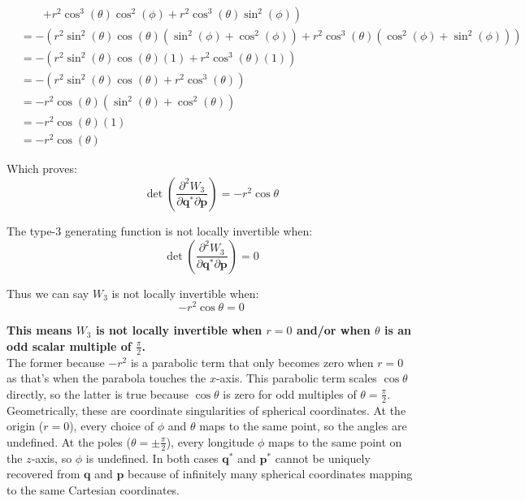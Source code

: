 \documentclass[titlepage]{article}
\begin{document}
\begin{equation}
\begin{split}
		&\qquad\left.+r^2\cos^3(\theta)\cos^2(\phi)+r^2\cos^3(\theta)\sin^2(\phi)\right) \\
		&=-\left(r^2\sin^2(\theta)\cos(\theta)\left(\sin^2(\phi)+\cos^2(\phi)\right)+r^2\cos^3(\theta)\left(\cos^2(\phi)+\sin^2(\phi)\right)\right) \\
		&=-\left(r^2\sin^2(\theta)\cos(\theta)\left(1\right)+r^2\cos^3(\theta)\left(1\right)\right) \\
		&=-\left(r^2\sin^2(\theta)\cos(\theta)+r^2\cos^3(\theta)\right) \\
		&=-r^2\cos(\theta)\left(\sin^2(\theta)+\cos^2(\theta)\right) \\
		&=-r^2\cos(\theta)(1) \\
		&=-r^2\cos(\theta)
	\end{split}
\end{equation}

\begin{mdframed}[linewidth=1pt, innertopmargin=10pt, innerbottommargin=10pt]
	Which proves:
	\begin{equation}
		\det\left(\frac{\partial^2W_3}{\partial\boldsymbol{q}^*\partial\boldsymbol{p}}\right)=-r^2\cos\theta
	\end{equation}
\end{mdframed}

\newpage

\begin{mdframed}[linewidth=1pt, innertopmargin=10pt, innerbottommargin=10pt]
	The type-3 generating function is not locally invertible when:
	\begin{equation}
		\det\left(\frac{\partial^2W_3}{\partial\boldsymbol{q}^*\partial\boldsymbol{p}}\right)=0
	\end{equation}
	
	Thus we can say $W_3$ is not locally invertible when:
	\begin{equation}
		-r^2\cos\theta=0
	\end{equation}
	
	\textbf{This means $W_3$ is not locally invertible when $r=0$ and/or when $\theta$ is an odd scalar multiple of $\frac{\pi}{2}$.} \\
	
	The former because $-r^2$ is a parabolic term that only becomes zero when $r=0$ as that's when the parabola touches the $x$-axis. This parabolic term scales $\cos\theta$ directly, so the latter is true because $\cos\theta$ is zero for odd multiples of $\theta=\frac{\pi}{2}$. \\
	
	Geometrically, these are coordinate singularities of spherical coordinates. At the origin ($r=0$), every choice of $\phi$ and $\theta$ maps to the same point, so the angles are undefined. At the poles ($\theta=\pm\frac{\pi}{2}$), every longitude $\phi$ maps to the same point on the $z$-axis, so $\phi$ is undefined. In both cases $\boldsymbol{q}^*$ and $\boldsymbol{p}^*$ cannot be uniquely recovered from $\boldsymbol{q}$ and $\boldsymbol{p}$ because of infinitely many spherical coordinates mapping to the same Cartesian coordinates.
\end{mdframed}
\end{document}
